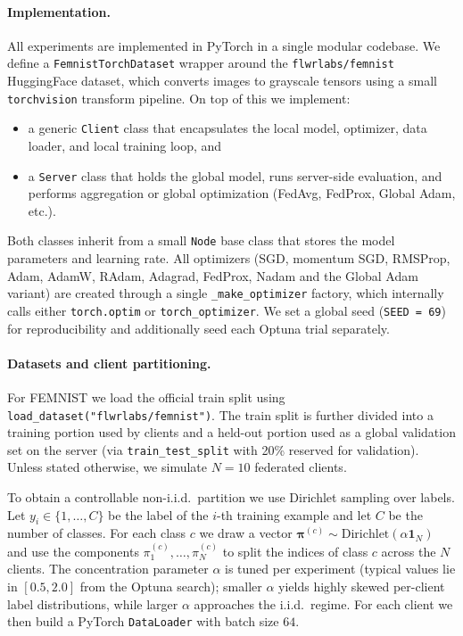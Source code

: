 \documentclass[10pt,twocolumn,letterpaper]{article}
\begin{document}
\paragraph{Implementation.}
All experiments are implemented in PyTorch in a single modular codebase.
We define a \texttt{FemnistTorchDataset} wrapper around the
\texttt{flwrlabs/femnist} HuggingFace dataset, which converts images to
grayscale tensors using a small \texttt{torchvision} transform pipeline.
On top of this we implement:
\begin{itemize}
    \item a generic \texttt{Client} class that encapsulates the local
    model, optimizer, data loader, and local training loop, and
    \item a \texttt{Server} class that holds the global model, runs
    server-side evaluation, and performs aggregation or global
    optimization (FedAvg, FedProx, Global Adam, etc.).
\end{itemize}
Both classes inherit from a small \texttt{Node} base class that stores
the model parameters and learning rate.  All optimizers (SGD, momentum
SGD, RMSProp, Adam, AdamW, RAdam, Adagrad, FedProx, Nadam and the
Global Adam variant) are created through a single
\texttt{\_make\_optimizer} factory, which internally calls either
\texttt{torch.optim} or \texttt{torch\_optimizer}.  We set a global
seed (\texttt{SEED = 69}) for reproducibility and additionally seed each
Optuna trial separately.

\paragraph{Datasets and client partitioning.}
For FEMNIST we load the official train split using
\texttt{load\_dataset("flwrlabs/femnist")}.
The train split is further divided into a training portion used by
clients and a held-out portion used as a global validation set on the
server (via \texttt{train\_test\_split} with 20\% reserved for
validation).  Unless stated otherwise, we simulate
$N=10$ federated clients.

To obtain a controllable non-i.i.d.\ partition we use Dirichlet
sampling over labels.  Let $y_i \in \{1,\dots,C\}$ be the label of the
$i$-th training example and let $C$ be the number of classes.  For each
class $c$ we draw a vector
$\boldsymbol{\pi}^{(c)} \sim \mathrm{Dirichlet}(\alpha \mathbf{1}_N)$
and use the components $\pi^{(c)}_1,\dots,\pi^{(c)}_N$ to split the
indices of class $c$ across the $N$ clients.  The concentration
parameter $\alpha$ is tuned per experiment (typical values lie in
$[0.5, 2.0]$ from the Optuna search); smaller $\alpha$ yields highly
skewed per-client label distributions, while larger $\alpha$ approaches
the i.i.d.\ regime.  For each client we then build a PyTorch
\texttt{DataLoader} with batch size $64$.
\end{document}
